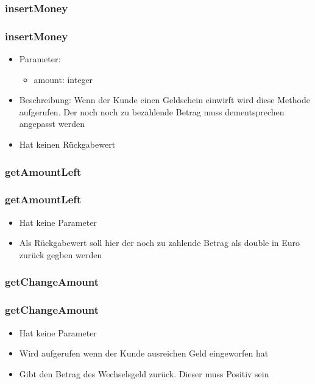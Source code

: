 \documentclass[final]{beamer}
\begin{document}
\subsubsection{insertMoney}
\begin{frame}
	\frametitle{insertMoney}
	\begin{itemize}
		\item{Parameter:}
			\begin{itemize}
				\item{amount: integer}
			\end{itemize}
		\item{Beschreibung:}
Wenn der Kunde einen Geldschein einwirft wird diese Methode aufgerufen. Der noch noch zu bezahlende Betrag muss dementsprechen angepasst werden
		\item{Hat keinen Rückgabewert}
	\end{itemize}
\end{frame}

\subsubsection{getAmountLeft}
\begin{frame}
	\frametitle{getAmountLeft}
	\begin{itemize}
		\item{Hat keine Parameter}
		\item{Als Rückgabewert soll hier der noch zu zahlende Betrag als double in Euro zurück gegben werden}
	\end{itemize}
\end{frame}

\subsubsection{getChangeAmount}
\begin{frame}
	\frametitle{getChangeAmount}
	\begin{itemize}
		\item{Hat keine Parameter}
		\item{Wird aufgerufen wenn der Kunde ausreichen Geld eingeworfen hat}
		\item{Gibt den Betrag des Wechselsgeld zurück. Dieser muss Positiv sein}
	\end{itemize}
\end{frame}
\end{document}
